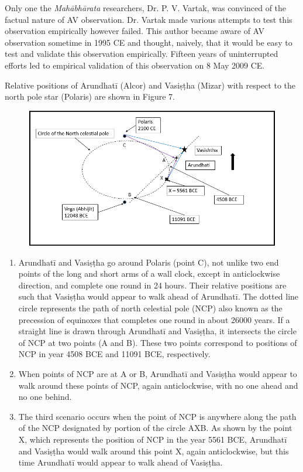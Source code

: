 Only one the \textit{Mahābhārata} researchers, Dr. P. V. Vartak, was convinced of the factual nature of AV observation. Dr. Vartak made various attempts to test this observation empirically however failed. This author became aware of AV observation sometime in 1995 CE and thought, naively, that it would be easy to test and validate this observation empirically. Fifteen years of uninterrupted efforts led to empirical validation of this observation on 8 May 2009 CE.

Relative positions of Arundhatī (Alcor) and Vasiṣṭha (Mizar) with respect to the north pole star (Polaris) are shown in Figure 7.

\begin{figure}[!h]
\includegraphics[scale=.3]{images/chap2-8.jpg}
\caption{}\label{chap1-fig7}
\end{figure}

\begin{enumerate}
\itemsep=0pt
\item Arundhatī and Vasiṣṭha go around Polaris (point C), not unlike two end points of the long and short arms of a wall clock, except in anticlockwise direction, and complete one round in 24 hours. Their relative positions are such that Vasiṣṭha would appear to walk ahead of Arundhatī. The dotted line circle represents the path of north celestial pole (NCP) also known as the precession of equinoxes that completes one round in about 26000 years. If a straight line is drawn through Arundhatī and Vasiṣṭha, it intersects the circle of NCP at two points (A and B). These two points correspond to positions of NCP in year 4508 BCE and 11091 BCE, respectively.

 \item When points of NCP are at A or B, Arundhatī and Vasiṣṭha would appear to walk around these points of NCP, again anticlockwise, with no one ahead and no one behind.

 \item The third scenario occurs when the point of NCP is anywhere along the path of the NCP designated by portion of the circle AXB. As shown by the point X, which represents the position of NCP in the year 5561 BCE, Arundhatī and Vasiṣṭha would walk around this point X, again anticlockwise, but this time Arundhatī would appear to walk ahead of Vasiṣṭha.

\end{enumerate}

